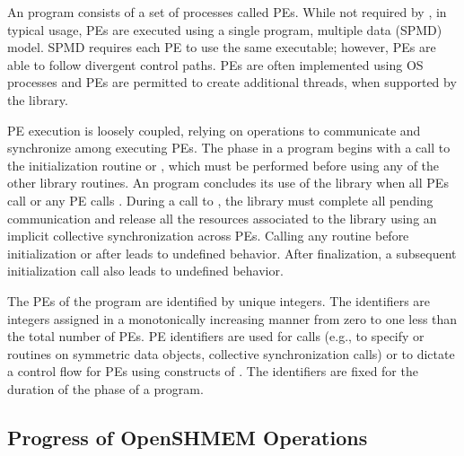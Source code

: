 An \openshmem program consists of a set of \openshmem processes called
\acp{PE}.  While not required by \openshmem, in typical usage, \acp{PE} are
executed using a single program, multiple data (\ac{SPMD}) model.  \ac{SPMD}
requires each \ac{PE} to use the same executable; however, \acp{PE} are able to
follow divergent control paths.  \acp{PE} are often implemented using \ac{OS}
processes and \acp{PE} are permitted to create additional
threads, when supported by the \openshmem library.

\ac{PE} execution is loosely coupled, relying on \openshmem operations to
communicate and synchronize among executing \acp{PE}.  The \openshmem phase in
a program begins with a call to the initialization routine 
or , which must be performed before using any of the
other \openshmem library routines. 
An \openshmem program concludes its use of the \openshmem library when all \acp{PE} call
 or any \ac{PE} calls .
During a call to , the \openshmem library must
complete all pending communication and release all the resources associated to
the library using an implicit collective synchronization across \acp{PE}.
Calling any \openshmem routine before initialization or after
 leads to undefined behavior. After finalization, a
subsequent initialization call also leads to undefined behavior.

The \acp{PE} of the \openshmem program are identified by unique integers.  The
identifiers are integers assigned in a monotonically increasing manner from zero
to one less than the total number of \acp{PE}. \ac{PE} identifiers are used for
\openshmem calls (e.g., to specify  or  routines on symmetric
data objects, collective synchronization calls) or to dictate a control flow for
\acp{PE} using constructs of \Cstd. The identifiers are fixed for
the duration of the \openshmem phase of a program.

\subsection{Progress of OpenSHMEM Operations}\label{subsec:progress}


